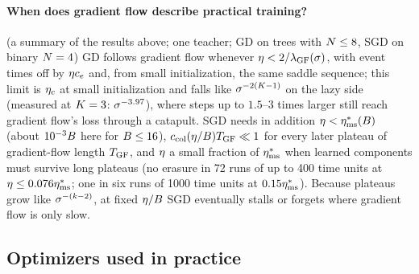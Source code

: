 \paragraph{When does gradient flow describe practical training?}
\empirical{} \derived{} (a summary of the results above; one teacher; GD on trees with $N\le8$, SGD on binary
$N=4$) GD follows gradient flow whenever $\eta<2/\lambda_{\rm GF}(\sigma)$, with event times off by $\eta c_e$ and, from
small initialization, the same saddle sequence; this limit is $\eta_c$ at small initialization and falls like
$\sigma^{-2(K-1)}$ on the lazy side (measured at $K=3$: $\sigma^{-3.97}$), where steps up to $1.5$--$3$ times larger still
reach gradient flow's loss through a catapult. SGD needs in addition $\eta<\eta^*_{\rm ms}(B)$ (about
$10^{-3}B$ here for $B\le16$), $c_{\rm col}(\eta/B)T_{\rm GF}\ll1$ for every later plateau of gradient-flow length $T_{\rm GF}$, and $\eta$
a small fraction of $\eta^*_{\rm ms}$ when learned components must survive long plateaus (no erasure in 72 runs of up
to 400 time units at $\eta\le0.076\eta^*_{\rm ms}$; one in six runs of 1000 time units at $0.15\eta^*_{\rm ms}$). Because
plateaus grow like $\sigma^{-(k-2)}$, at fixed $\eta/B$ SGD eventually stalls or forgets where gradient flow is
only slow.

\subsection{Optimizers used in practice}\label{sec:other-optimizers}

